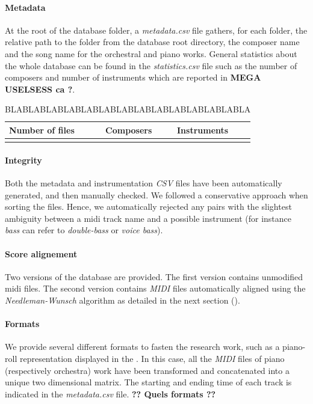 \documentclass[twoside,twocolumn]{article}
\begin{document}
\paragraph{Metadata}
At the root of the database folder, a \textit{metadata.csv} file gathers, for each folder, the relative path to the folder from the database root directory, the composer name and the song name for the orchestral and piano works.
General statistics about the whole database can be found in the \textit{statistics.csv} file such as the number of composers and number of instruments which are reported in  \textbf{MEGA USELSESS ca ?}.

\begin{table}[h]
\centering
\begin{tabular}{lll}
   Number of files & Composers & Instruments\\
   \hline
    &  & 
   \\
\end{tabular}
\caption{BLABLABLABLABLABLABLABLABLABLABLABLABLABLA}
\label{tab:stats}
\end{table}

\paragraph{Integrity}
Both the metadata and instrumentation \textit{CSV} files have been automatically generated, and then manually checked. We followed a conservative approach when sorting the files. Hence, we automatically rejected any pairs with the slightest ambiguity between a midi track name and a possible instrument (for instance \textit{bass} can refer to \textit{double-bass} or \textit{voice bass}).

\paragraph{Score alignement}
Two versions of the database are provided. The first version contains unmodified midi files. The second version contains \textit{MIDI} files automatically aligned using the \textit{Needleman-Wunsch} \cite{NEEDLEMAN1970443} algorithm as detailed in the next section ().

\paragraph{Formats}
We provide several different formats to fasten the research work, such as a piano-roll representation displayed in the . In this case, all the \textit{MIDI} files of piano (respectively orchestra) work have been transformed and concatenated into a unique two dimensional matrix. The starting and ending time of each track is indicated in the \textit{metadata.csv} file.
\textbf{?? Quels formats ??}
\end{document}
